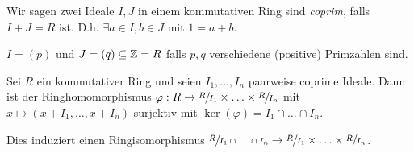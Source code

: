 \begin{definition}
	Wir sagen zwei Ideale $I, J$ in einem kommutativen Ring sind \emph{coprim}, falls $I+J = R$ ist.
	D.h. $\exists a \in I, b \in J $ mit $1 = a + b$.
\end{definition}

\begin{eg}
	$I = (p)$ und $J = (q) \subseteq \mathbb{Z} = R$ falls $p,q$ verschiedene (positive) Primzahlen sind.
\end{eg}

\begin{proposition}
	Sei $R$ ein kommutativer Ring und seien $I_1, \ldots, I_{n}$ paarweise coprime Ideale.
	Dann ist der Ringhomomorphismus $\varphi: R \to \sfrac{R}{I_1} \times  \ldots \times \sfrac{R}{I_{n}}$ mit
	$x \mapsto (x+I_1,\ldots,x+I_{n})$ surjektiv mit $\ker(\varphi) = I_1 \cap \ldots \cap I_{n}$.

	Dies induziert einen Ringisomorphismus $\sfrac{R}{I_1 \cap \ldots \cap I_{n}} \to  \sfrac{R}{I_1} \times \ldots \times \sfrac{R}{I_{n}}$.
\end{proposition}

